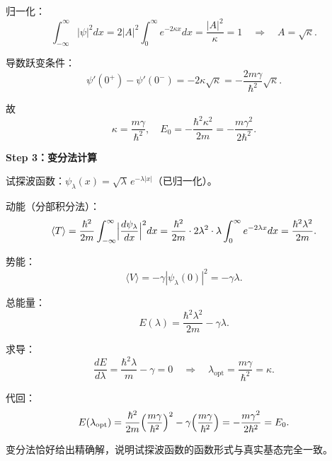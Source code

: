 \begin{derivationbox}
归一化：
\[
\int_{-\infty}^{\infty}|\psi|^2dx=2|A|^2\int_0^{\infty}e^{-2\kappa x}dx=\frac{|A|^2}{\kappa}=1
\quad\Rightarrow\quad A=\sqrt{\kappa}.
\]

导数跃变条件：
\[
\psi'(0^+)-\psi'(0^-)=-2\kappa\sqrt{\kappa}=-\frac{2m\gamma}{\hbar^2}\sqrt{\kappa}.
\]

故
\[
\kappa=\frac{m\gamma}{\hbar^2},\quad E_0=-\frac{\hbar^2\kappa^2}{2m}=-\frac{m\gamma^2}{2\hbar^2}.
\]

\textbf{Step 3：变分法计算}

试探波函数：$\psi_\lambda(x)=\sqrt{\lambda}\,e^{-\lambda|x|}$（已归一化）。

动能（分部积分法）：
\[
\langle T\rangle=\frac{\hbar^2}{2m}\int_{-\infty}^{\infty}\Bigl|\frac{d\psi_\lambda}{dx}\Bigr|^2dx
=\frac{\hbar^2}{2m}\cdot2\lambda^2\cdot\lambda\int_0^{\infty}e^{-2\lambda x}dx
=\frac{\hbar^2\lambda^2}{2m}.
\]

势能：
\[
\langle V\rangle=-\gamma|\psi_\lambda(0)|^2=-\gamma\lambda.
\]

总能量：
\[
E(\lambda)=\frac{\hbar^2\lambda^2}{2m}-\gamma\lambda.
\]

求导：
\[
\frac{dE}{d\lambda}=\frac{\hbar^2\lambda}{m}-\gamma=0\quad\Rightarrow\quad\lambda_{\text{opt}}=\frac{m\gamma}{\hbar^2}=\kappa.
\]

代回：
\[
E(\lambda_{\text{opt}})=\frac{\hbar^2}{2m}\Bigl(\frac{m\gamma}{\hbar^2}\Bigr)^2-\gamma\Bigl(\frac{m\gamma}{\hbar^2}\Bigr)
=-\frac{m\gamma^2}{2\hbar^2}=E_0.
\]

变分法恰好给出精确解，说明试探波函数的函数形式与真实基态完全一致。
\end{derivationbox}

\vspace{1em}
